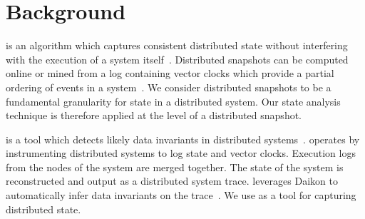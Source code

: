 \section{Background}
\label{sec:background}


 is an algorithm which
captures consistent distributed state without interfering with the
execution of a system itself~\cite{dist_snapshots_Chandy1985}.
Distributed snapshots can be computed online or mined from a log
containing vector clocks which provide a partial ordering of events in
a system~\cite{mattern_vector_clocks_1989}. We consider distributed
snapshots to be a fundamental granularity for state in a distributed
system. Our state analysis technique is therefore applied at the level
of a distributed snapshot.

\noindent{\textbf{\dinv}} is a tool which detects likely data invariants in distributed
systems~\cite{dinv}. \dinv operates by instrumenting distributed
systems to log state and vector clocks. Execution logs from the nodes
of the system are merged together. The state of the system is
reconstructed and output as a distributed system trace. \dinv
leverages Daikon to automatically infer data invariants on the trace~\cite{Ernst01}.
We use \dinv as a tool for capturing distributed state.


